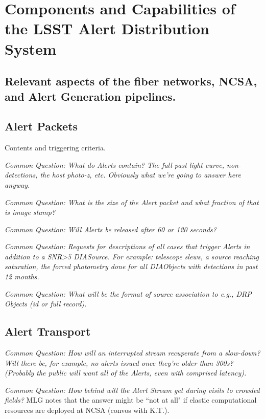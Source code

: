 \section{Components and Capabilities of the LSST Alert Distribution System}\label{sec:components}

\subsection{Relevant aspects of the fiber networks, NCSA, and Alert Generation pipelines.}

\subsection{Alert Packets}

Contents and triggering criteria.

{\it Common Question: What do Alerts contain? The full past light curve, non-detections, the host photo-z, etc. Obviously what we're going to answer here anyway.}

{\it Common Question: What is the size of the Alert packet and what fraction of that is image stamp?}

{\it Common Question: Will Alerts be released after 60 or 120 seconds?}

{\it Common Question: Requests for descriptions of all cases that trigger Alerts in addition to a SNR>5 DIASource. For example: telescope slews, a source reaching saturation, the forced photometry done for all DIAObjects with detections in past 12 months.}

{\it Common Question: What will be the format of source association to e.g., DRP Objects (id or full record).}



\subsection{Alert Transport}

{\it Common Question: How will an interrupted stream recuperate from a slow-down? Will there be, for example, no alerts issued once they're older than 300s? (Probably the public will want all of the Alerts, even with comprised latency).}

{\it Common Question: How behind will the Alert Stream get during visits to crowded fields?} MLG notes that the answer might be ``not at all" if elastic computational resources are deployed at NCSA (convos with K.T.).


